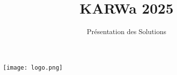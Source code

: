 \title{KARWa 2025}
\subtitle{Présentation des Solutions}
\begin{frame}
\titlepage
{\center \texttt{[image: logo.png]}}
\end{frame}

